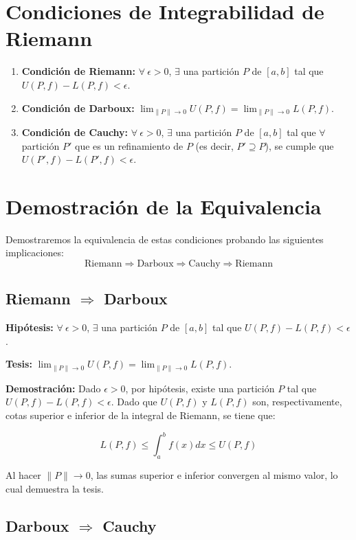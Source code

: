 \documentclass{article}
\begin{document}
	\section{Condiciones de Integrabilidad de Riemann}
	\begin{enumerate}
		\item \textbf{Condición de Riemann:} $\forall\ \epsilon > 0$, $\exists$ una partición $P$ de $[a, b]$ tal que $U(P, f) - L(P, f) < \epsilon$.
		
		\item \textbf{Condición de Darboux:} $\lim_{\|P\| \to 0} U(P, f) = \lim_{\|P\| \to 0} L(P, f)$.
		
		\item \textbf{Condición de Cauchy:} $\forall\ \epsilon > 0$, $\exists$ una partición $P$ de $[a, b]$ tal que $\forall$ partición $P'$ que es un refinamiento de $P$ (es decir, $P' \supseteq P$), se cumple que $U(P', f) - L(P', f) < \epsilon$.
	\end{enumerate}
	
	\section{Demostración de la Equivalencia}
	Demostraremos la equivalencia de estas condiciones probando las siguientes implicaciones:
	$$ \text{Riemann} \Rightarrow \text{Darboux} \Rightarrow \text{Cauchy} \Rightarrow \text{Riemann} $$
	
	\subsection{Riemann $\Rightarrow$ Darboux}
	\textbf{Hipótesis:} $\forall\ \epsilon > 0$, $\exists$ una partición $P$ de $[a, b]$ tal que $U(P, f) - L(P, f) < \epsilon$.
	
	\textbf{Tesis:} $\lim_{\|P\| \to 0} U(P, f) = \lim_{\|P\| \to 0} L(P, f)$.
	
	\textbf{Demostración:} Dado $\epsilon > 0$, por hipótesis, existe una partición $P$ tal que $U(P, f) - L(P, f) < \epsilon$. Dado que $U(P, f)$ y $L(P, f)$ son, respectivamente, cotas superior e inferior de la integral de Riemann, se tiene que:
	
	$$ L(P, f) \leq \int_{a}^{b} f(x) dx \leq U(P, f) $$
	
	Al hacer $\|P\| \to 0$, las sumas superior e inferior convergen al mismo valor, lo cual demuestra la tesis.
	
	\subsection{Darboux $\Rightarrow$ Cauchy}
\end{document}
